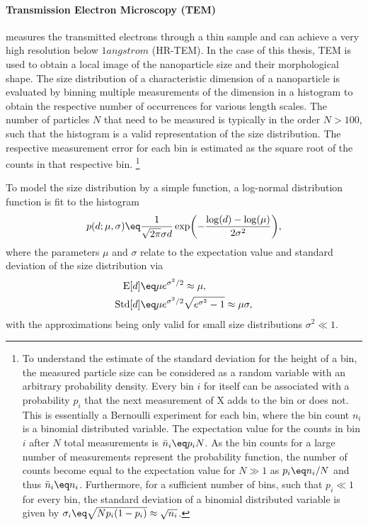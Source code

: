 \documentclass[\main/dresen_thesis.tex]{subfiles}
\begin{document}
    \paragraph{Transmission Electron Microscopy (TEM)}
      measures the transmitted electrons through a thin sample and can achieve a very high resolution below $1 \unit{angstrom}$ (HR-TEM).
      In the case of this thesis, TEM is used to obtain a local image of the nanoparticle size and their morphological shape.
      The size distribution of a characteristic dimension of a nanoparticle is evaluated by binning multiple measurements of the dimension in a histogram to obtain the respective number of occurrences for various length scales.
      The number of particles $N$ that need to be measured is typically in the order $N > 100$, such that the histogram is a valid representation of the size distribution.
      The respective measurement error for each bin is estimated as the square root of the counts in that respective bin. \footnote{To understand the estimate of the standard deviation for the height of a bin, the measured particle size can be considered as a random variable with an arbitrary probability density.
      Every bin $i$ for itself can be associated with a probability $p_i$ that the next measurement of X adds to the bin or does not.
      This is essentially a Bernoulli experiment for each bin, where the bin count $n_i$ is a binomial distributed variable.
      The expectation value for the counts in bin $i$ after $N$ total measurements is $\bar{n}_i \eq p_i N$.
      As the bin counts for a large number of measurements represent the probability function, the number of counts become equal to the expectation value for $N \gg 1$ as $p_i \eq n_i / N$ and thus $\bar{n}_i \eq n_i$.
      Furthermore, for a sufficient number of bins, such that $p_i \ll 1$ for every bin, the standard deviation of a binomial distributed variable is given by $\sigma_i \eq \sqrt{N p_i (1-p_i)} \approx \sqrt{n_i}$.}

      To model the size distribution by a simple function, a log-normal distribution function is fit to the histogram
      \begin{align}\label{eq:looselyPackedNP:nanoparticle:lognormalDist}
        p(d; \mu, \sigma) \eq \frac{1}{\sqrt{2\pi} \sigma d} \exp \biggl( - \frac{\log(d) - \log(\mu)}{2 \sigma^2} \biggr),
      \end{align}
      where the parameters $\mu$ and $\sigma$ relate to the expectation value and standard deviation of the size distribution via
      \begin{align}
        \mathrm{E}[d] \eq& \mu e^{\sigma^2/2} \approx \mu,\\
        \mathrm{Std}[d] \eq& \mu e^{\sigma^2/2} \sqrt{e^{\sigma^2} - 1} \approx \mu \sigma,\\
      \end{align}
      with the approximations being only valid for small size distributions $\sigma^2 \ll 1$.
\end{document}
